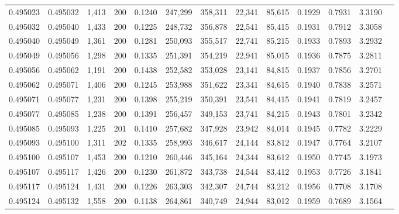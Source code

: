 \begin{tabular}{rrrrrrrrrrrrr}
0.495023 & 0.495032 & 1,413 & 200 &                                     0.1240 & 247,299 & 358,311 &  22,341 &  85,615 & 0.1929 & 0.7931 & 3.3190 \\
0.495032 & 0.495040 & 1,433 & 200 &                                     0.1225 & 248,732 & 356,878 &  22,541 &  85,415 & 0.1931 & 0.7912 & 3.3058 \\
0.495040 & 0.495049 & 1,361 & 200 &                                     0.1281 & 250,093 & 355,517 &  22,741 &  85,215 & 0.1933 & 0.7893 & 3.2932 \\
0.495049 & 0.495056 & 1,298 & 200 &                                     0.1335 & 251,391 & 354,219 &  22,941 &  85,015 & 0.1936 & 0.7875 & 3.2811 \\
0.495056 & 0.495062 & 1,191 & 200 &                                     0.1438 & 252,582 & 353,028 &  23,141 &  84,815 & 0.1937 & 0.7856 & 3.2701 \\
0.495062 & 0.495071 & 1,406 & 200 &                                     0.1245 & 253,988 & 351,622 &  23,341 &  84,615 & 0.1940 & 0.7838 & 3.2571 \\
0.495071 & 0.495077 & 1,231 & 200 &                                     0.1398 & 255,219 & 350,391 &  23,541 &  84,415 & 0.1941 & 0.7819 & 3.2457 \\
0.495077 & 0.495085 & 1,238 & 200 &                                     0.1391 & 256,457 & 349,153 &  23,741 &  84,215 & 0.1943 & 0.7801 & 3.2342 \\
0.495085 & 0.495093 & 1,225 & 201 &                                     0.1410 & 257,682 & 347,928 &  23,942 &  84,014 & 0.1945 & 0.7782 & 3.2229 \\
0.495093 & 0.495100 & 1,311 & 202 &                                     0.1335 & 258,993 & 346,617 &  24,144 &  83,812 & 0.1947 & 0.7764 & 3.2107 \\
0.495100 & 0.495107 & 1,453 & 200 &                                     0.1210 & 260,446 & 345,164 &  24,344 &  83,612 & 0.1950 & 0.7745 & 3.1973 \\
0.495107 & 0.495117 & 1,426 & 200 &                                     0.1230 & 261,872 & 343,738 &  24,544 &  83,412 & 0.1953 & 0.7726 & 3.1841 \\
0.495117 & 0.495124 & 1,431 & 200 &                                     0.1226 & 263,303 & 342,307 &  24,744 &  83,212 & 0.1956 & 0.7708 & 3.1708 \\
0.495124 & 0.495132 & 1,558 & 200 &                                     0.1138 & 264,861 & 340,749 &  24,944 &  83,012 & 0.1959 & 0.7689 & 3.1564 \\

\end{tabular}
